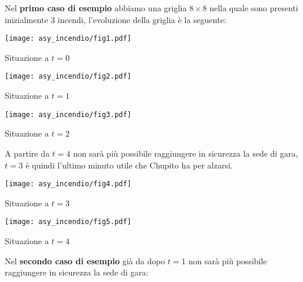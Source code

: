 \Examples

\begin{example}
%
%
\end{example}



\Explanation

Nel \textbf{primo caso di esempio} abbiamo una griglia $8 \times 8$ nella quale
sono presenti inizialmente $3$ incendi, l'evoluzione della griglia è la
seguente:

\begin{center}
	\begin{minipage}{0.31\linewidth}
		\texttt{[image: asy\_incendio/fig1.pdf]}
		\caption*{Situazione a $t=0$}
	\end{minipage}
	\hspace{0.02\linewidth}
	\begin{minipage}{0.31\linewidth}
		\texttt{[image: asy\_incendio/fig2.pdf]}
		\caption*{Situazione a $t=1$}
	\end{minipage}
	\hspace{0.02\linewidth}
	\begin{minipage}{0.31\linewidth}
		\texttt{[image: asy\_incendio/fig3.pdf]}
		\caption*{Situazione a $t=2$}
	\end{minipage}
\end{center}

A partire da $t = 4$ non sarà più possibile raggiungere in sicurezza la sede di
gara, $t = 3$ è quindi l'ultimo minuto utile che Chupito ha per alzarsi.

\begin{center}
	\begin{minipage}{0.31\linewidth}
		\texttt{[image: asy\_incendio/fig4.pdf]}
		\caption*{Situazione a $t=3$}
	\end{minipage}
	\hspace{0.03\linewidth}
	\begin{minipage}{0.31\linewidth}
		\texttt{[image: asy\_incendio/fig5.pdf]}
		\caption*{Situazione a $t=4$}
	\end{minipage}
\end{center}

Nel \textbf{secondo caso di esempio} già da dopo $t = 1$ non sarà più possibile
raggiungere in sicurezza la sede di gara:

